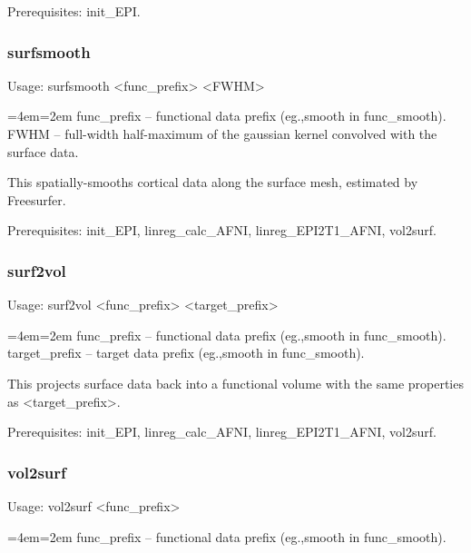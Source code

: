 \documentclass[final,titlepage,letterpaper,oneside,12pt]{article}
\renewcommand{\texttt}[2][BrickRed]{\textcolor{#1}{\ttfamily #2}}%
\newenvironment{blockquote}{%
  \par%
  \medskip
  \leftskip=4em\rightskip=2em%
  \noindent\ignorespaces}{%
  \par\medskip}
\begin{document}
Prerequisites: \texttt{init\_EPI}.

\subsubsection{surfsmooth}
Usage: \texttt{surfsmooth <func\_prefix> <FWHM>}

\begin{blockquote}
func\_prefix -- functional data prefix (eg.,smooth in func\_smooth). \\
FWHM -- full-width half-maximum of the gaussian kernel convolved with the surface data. \
\end{blockquote}

\noindent This spatially-smooths cortical data along the surface mesh, estimated by Freesurfer.

Prerequisites: \texttt{init\_EPI}, \texttt{linreg\_calc\_AFNI}, \texttt{linreg\_EPI2T1\_AFNI}, \texttt{vol2surf}.

\subsubsection{surf2vol}
Usage: \texttt{surf2vol <func\_prefix> <target\_prefix>}

\begin{blockquote}
func\_prefix -- functional data prefix (eg.,smooth in func\_smooth). \\
target\_prefix -- target data prefix (eg.,smooth in func\_smooth). \
\end{blockquote}

\noindent This projects surface data back into a functional volume with the same properties as <target\_prefix>.

Prerequisites: \texttt{init\_EPI}, \texttt{linreg\_calc\_AFNI}, \texttt{linreg\_EPI2T1\_AFNI}, \texttt{vol2surf}.

\subsubsection{vol2surf}
Usage: \texttt{vol2surf <func\_prefix>}

\begin{blockquote}
func\_prefix -- functional data prefix (eg.,smooth in func\_smooth).
\end{blockquote}
\end{document}
